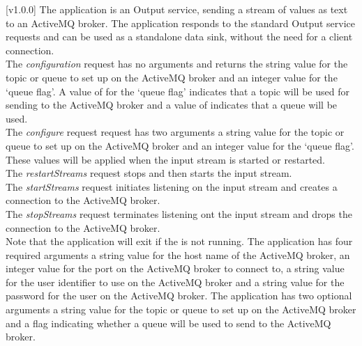 [v1.0.0]
The  application is an Output service, sending a stream
of \yarp{} values as \json{} text to an ActiveMQ broker.
The application responds to the standard Output service requests and can be used as a
standalone data sink, without the need for a client connection.\\

The \emph{configuration} request has no arguments and returns the string value for the
topic or queue to set up on the ActiveMQ broker and an integer value for the `queue flag'.
A value of  for the `queue flag' indicates that a topic will be used for
sending to the ActiveMQ broker and a value of  indicates that a queue will
be used.\\

The \emph{configure} request request has two arguments \longDash{} a string value for the
topic or queue to set up on the ActiveMQ broker and an integer value for the `queue flag'.
These values will be applied when the input stream is started or restarted.\\

The \emph{restartStreams} request stops and then starts the input stream.\\

The \emph{startStreams} request initiates listening on the input stream and creates a
connection to the ActiveMQ broker.\\

The \emph{stopStreams} request terminates listening ont the input stream and drops the
connection to the ActiveMQ broker.\\ 

Note that the application will exit if the \emph{\RS} is not running.
The application has four required arguments \longDash{} a string value for the host name
of the ActiveMQ broker, an integer value for the port on the ActiveMQ broker to
connect to, a string value for the user identifier to use on the ActiveMQ broker and a
string value for the password for the user on the ActiveMQ broker.
The application has two optional arguments \longDash{} a string value for the
topic or queue to set up on the ActiveMQ broker and a flag indicating whether a queue will
be used to send to the ActiveMQ broker.
\insertAppParameters
\insertTagDescription{\SMO}
\insertInputServiceComment

